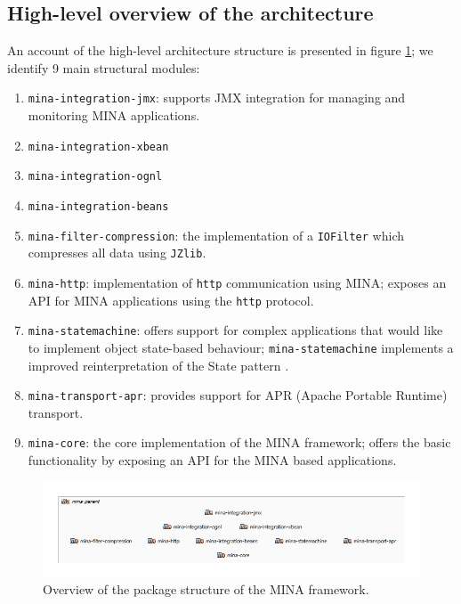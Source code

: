 \subsection{High-level overview of the architecture}
\label{sec:archi_overview}
An account of the high-level architecture structure is presented in figure \ref{fig:packages_structure}; we identify 9 main structural modules:
\begin{enumerate}
    \item \texttt{mina-integration-jmx}: supports JMX integration for managing and monitoring MINA applications.
    \item \texttt{mina-integration-xbean}
    \item \texttt{mina-integration-ognl}
    \item \texttt{mina-integration-beans}
    \item \texttt{mina-filter-compression}: the implementation of a \texttt{IOFilter} which compresses all data using \texttt{JZlib}\cite{jzlib}.
    \item \texttt{mina-http}: implementation of \texttt{http} communication using MINA; exposes an API for MINA applications using the \texttt{http} protocol.
    \item \texttt{mina-statemachine}: offers support for complex applications that would like to implement object state-based behaviour; \texttt{mina-statemachine} implements a improved reinterpretation of the State pattern \cite{state_pattern}.
    \item \texttt{mina-transport-apr}: provides support for APR (Apache Portable Runtime)\cite{apr} transport.
    \item \texttt{mina-core}: the core implementation of the MINA framework; offers the basic functionality by exposing an API for the MINA based applications.
    
\end{enumerate}

\begin{figure}[H]
    \centering
    \includegraphics[width=\textwidth]{images/MINA_packages_overview.png}
    \caption{Overview of the package structure of the MINA framework.}
    \label{fig:packages_structure}
\end{figure}

